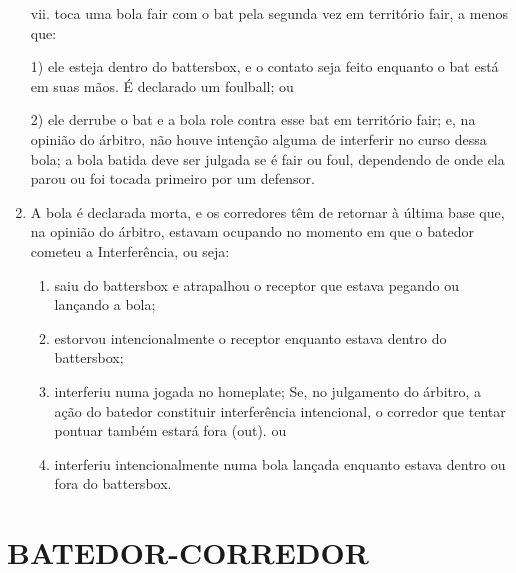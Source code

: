 \begin{enumerate}[label=(\alph*)]
 vii. toca uma bola \gls{fair} com o \gls{bat} pela segunda vez em território \gls{fair}, a menos que:

	 1) ele esteja dentro do \gls{battersbox}, e o contato seja feito enquanto o \gls{bat} está em suas mãos. É declarado um \gls{foulball}; ou

	 2) ele derrube o \gls{bat} e a bola role contra esse \gls{bat} em território \gls{fair}; e,
	 na opinião do árbitro, não houve intenção alguma de interferir no curso dessa bola; a bola batida deve ser julgada se é \gls{fair} ou \gls{foul}, dependendo de onde ela parou ou foi tocada primeiro por um defensor.

	\item  A bola é declarada morta, e os corredores têm de retornar à última base que, na opinião do árbitro, estavam ocupando no momento em que o batedor cometeu a Interferência, ou seja:

	\begin{enumerate}[label=\roman*.]
	 	\item saiu do \gls{battersbox} e atrapalhou o receptor que estava pegando ou lançando a bola;
		\item estorvou intencionalmente o receptor enquanto estava dentro do \gls{battersbox};
		\item interferiu numa jogada no \gls{homeplate}; Se, no julgamento do árbitro, a ação do batedor constituir interferência intencional, o corredor que tentar pontuar também estará fora (\gls{out}). ou
		\item interferiu intencionalmente numa bola lançada enquanto estava dentro ou fora do \gls{battersbox}.
	\end{enumerate}
\end{enumerate}

\section{BATEDOR-CORREDOR}
